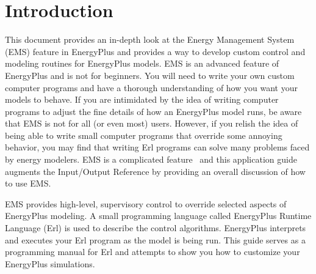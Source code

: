 

\chapter{Introduction}\label{introduction}

This document provides an in-depth look at the Energy Management System (EMS) feature in EnergyPlus and provides a way to develop custom control and modeling routines for EnergyPlus models. EMS is an advanced feature of EnergyPlus and is not for beginners. You will need to write your own custom computer programs and have a thorough understanding of how you want your models to behave. If you are intimidated by the idea of writing computer programs to adjust the fine details of how an EnergyPlus model runs, be aware that EMS is not for all (or even most) users. However, if you relish the idea of being able to write small computer programs that override some annoying behavior, you may find that writing Erl programs can solve many problems faced by energy modelers. EMS is a complicated feature~ and this application guide augments the Input/Output Reference by providing an overall discussion of how to use EMS.

EMS provides high-level, supervisory control to override selected aspects of EnergyPlus modeling. A small programming language called EnergyPlus Runtime Language (Erl) is used to describe the control algorithms. EnergyPlus interprets and executes your Erl program as the model is being run. This guide serves as a programming manual for Erl and attempts to show you how to customize your EnergyPlus simulations.
